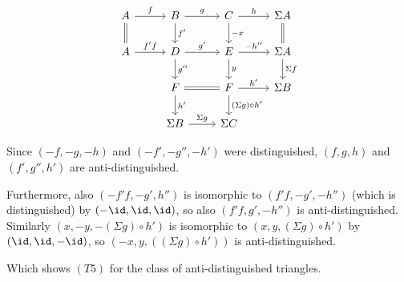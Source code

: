 \begin{exercise}[3]
\begin{enumerate}
\[ \begin{tikzcd}
A \ar[r, "f"] \ar[d, equal] &
B \ar[r, "g"] \ar[d, "f'"] &
C \ar[r, "h"] \ar[d, "-x"] &
\Sigma A      \ar[d, equal]
\\
A \ar[r, "f'f"]              &
D \ar[r, "g'"]  \ar[d, "g''"] &
E \ar[r, "-h''"] \ar[d, "y"]  &
\Sigma A        \ar[d, "\Sigma f"]
\\
&
F \ar[r, equal] \ar[d, "h'"] &
F \ar[r, "h'"] \ar[d, "(\Sigma g)\circ h'"]  &
\Sigma B
\\
&
\Sigma B \ar[r, "\Sigma g"] &
\Sigma C &
\end{tikzcd} \]

Since $(-f,-g,-h)$ and $(-f',-g'',-h')$ were distinguished, $(f,g,h)$ and
$(f',g'',h')$ are anti-distinguished. 

Furthermore, also $(-f'f, -g', h'')$ is isomorphic to $(f'f,-g', -h'')$
(which is distinguished) by $(-\id, \id, \id)$, so also $(f'f, g', -h'')$ is anti-distinguished.
Similarly $(x,-y,-(\Sigma g)\circ h')$ is isomorphic to $(x,y,(\Sigma g)\circ
h')$ by $(\id,\id,-\id)$, so $(-x,y,((\Sigma g)\circ h'))$ is
anti-distinguished.

Which shows $(T5)$ for the class of anti-distinguished triangles.
\end{enumerate}
\end{exercise}


